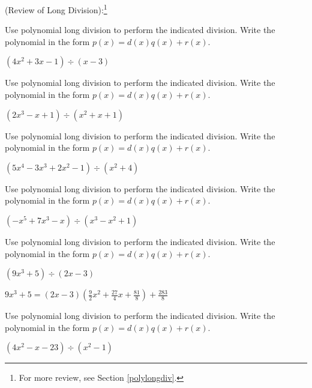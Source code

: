 \documentclass{ximera}
\begin{document}
	\author{Stitz-Zeager}



(Review of Long Division):\footnote{For more review, see Section \ref{polylongdiv}.}  

\begin{problem}\label{longpolydivreviewfirst}
Use polynomial long division to perform the indicated division.  Write the polynomial in the form $p(x) = d(x)q(x) + r(x)$.

$\left(4x^2+3x-1 \right) \div (x-3)$ 
\end{problem}

\begin{problem}
Use polynomial long division to perform the indicated division.  Write the polynomial in the form $p(x) = d(x)q(x) + r(x)$.

$\left(2x^3-x+1 \right) \div \left(x^{2} +x+1 \right)$ 
\end{problem}

\begin{problem}
Use polynomial long division to perform the indicated division.  Write the polynomial in the form $p(x) = d(x)q(x) + r(x)$.

$\left(5x^{4} - 3x^{3} + 2x^{2} - 1 \right) \div \left(x^{2} + 4 \right)$ 
\end{problem}

\begin{problem}
Use polynomial long division to perform the indicated division.  Write the polynomial in the form $p(x) = d(x)q(x) + r(x)$.

$\left(-x^{5} + 7x^{3} - x \right) \div \left(x^{3} - x^{2} + 1 \right)$ 
\end{problem} 

\begin{problem}
Use polynomial long division to perform the indicated division.  Write the polynomial in the form $p(x) = d(x)q(x) + r(x)$.

$\left(9x^{3} + 5 \right) \div \left(2x - 3 \right)$

\begin{solution}
$9x^{3} + 5 =(2x - 3) \left(\frac{9}{2}x^{2} + \frac{27}{4}x + \frac{81}{8} \right) + \frac{283}{8}$
\end{solution}
\end{problem} 

\begin{problem}\label{longpolydivreviewlast}
Use polynomial long division to perform the indicated division.  Write the polynomial in the form $p(x) = d(x)q(x) + r(x)$.

$\left(4x^2 - x - 23 \right) \div \left(x^{2} - 1 \right)$ 
\end{problem}  
\end{document}
